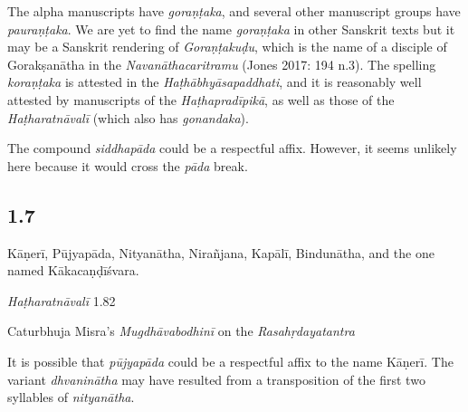 \begin{ekdosis}
\begin{testimonia}[hp01_006]
\end{testimonia}

\begin{philcomm}[hp01_006]        
The alpha manuscripts have \emph{goraṇṭaka}, and several other manuscript groups have \emph{pauraṇṭaka}.  We are yet to find the name \emph{goraṇṭaka} in other Sanskrit texts but it may be a Sanskrit rendering of \emph{Goraṇṭakuḍu}, which is the name of a disciple of Gorakṣanātha in the \emph{Navanāthacaritramu} (Jones 2017: 194 n.3). The spelling \emph{koraṇṭaka} is attested in the \emph{Haṭhābhyāsapaddhati}, and it is reasonably well attested by manuscripts of the \emph{Haṭhapradīpikā}, as well as those of the \emph{Haṭharatnāvalī} (which also has \emph{gonandaka}).

The compound \emph{siddhapāda} could be a respectful affix. However, it seems unlikely here because it would cross the \emph{pāda} break.  

\end{philcomm}

\subsection*{1.7}
\begin{translation}[hp01_007]
Kāṇerī, Pūjyapāda, Nityanātha, Nirañjana, Kapālī, Bindunātha, and the one named Kākacaṇḍīśvara.
\end{translation}

\begin{testimonia}[hp01_007]
\emph{Haṭharatnāvalī} 1.82

\begin{versinnote}
\end{versinnote}

Caturbhuja Misra's \emph{Mugdhāvabodhinī} on the \emph{Rasahṛdayatantra}

\begin{versinnote}
\end{versinnote}

\end{testimonia}

\begin{philcomm}[hp01_007]   
It is possible that \emph{pūjyapāda} could be a respectful affix to the name Kāṇerī. The variant \emph{dhvaninātha} may have resulted from a transposition of the first two syllables of \emph{nityanātha}.    


\end{philcomm}
\end{ekdosis}
